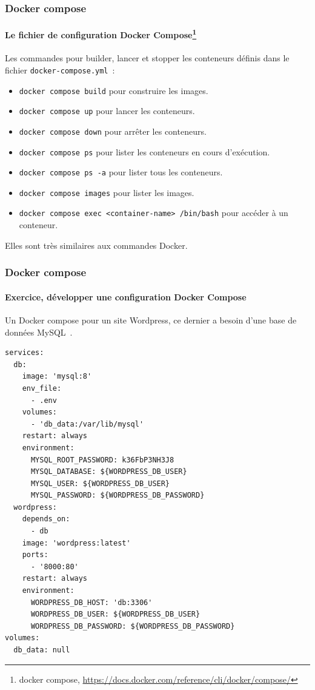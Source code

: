 \documentclass{beamer}
\begin{document}
    \begin{frame}[fragile]
        \transdissolve
        \frametitle{Docker compose}
        \framesubtitle{Le fichier de configuration Docker Compose\footnote{docker compose, \url{https://docs.docker.com/reference/cli/docker/compose/}}}
        Les commandes pour builder, lancer et stopper les conteneurs définis dans le fichier \lstinline{docker-compose.yml}~:
        \begin{itemize}
            \item \lstinline{docker compose build} pour construire les images.
            \item \lstinline{docker compose up} pour lancer les conteneurs.
            \item \lstinline{docker compose down} pour arrêter les conteneurs.
            \item \lstinline{docker compose ps} pour lister les conteneurs en cours d'exécution.
            \item \lstinline{docker compose ps -a} pour lister tous les conteneurs.
            \item \lstinline{docker compose images} pour lister les images.
            \item \lstinline{docker compose exec <container-name> /bin/bash} pour accéder à un conteneur.
        \end{itemize}
        Elles sont très similaires aux commandes Docker.
    \end{frame}

    \begin{frame}[fragile]
        \transdissolve
        \frametitle{Docker compose}
        \framesubtitle{Exercice, développer une configuration Docker Compose}
        Un Docker compose pour un site Wordpress, ce dernier a besoin d'une base de données MySQL~.
        \pause
        \begin{lstlisting}[basicstyle=\ttfamily\tiny]
services:
  db:
    image: 'mysql:8'
    env_file:
      - .env
    volumes:
      - 'db_data:/var/lib/mysql'
    restart: always
    environment:
      MYSQL_ROOT_PASSWORD: k36FbP3NH3J8
      MYSQL_DATABASE: ${WORDPRESS_DB_USER}
      MYSQL_USER: ${WORDPRESS_DB_USER}
      MYSQL_PASSWORD: ${WORDPRESS_DB_PASSWORD}
  wordpress:
    depends_on:
      - db
    image: 'wordpress:latest'
    ports:
      - '8000:80'
    restart: always
    environment:
      WORDPRESS_DB_HOST: 'db:3306'
      WORDPRESS_DB_USER: ${WORDPRESS_DB_USER}
      WORDPRESS_DB_PASSWORD: ${WORDPRESS_DB_PASSWORD}
volumes:
  db_data: null
        \end{lstlisting}
    \end{frame}
\end{document}
